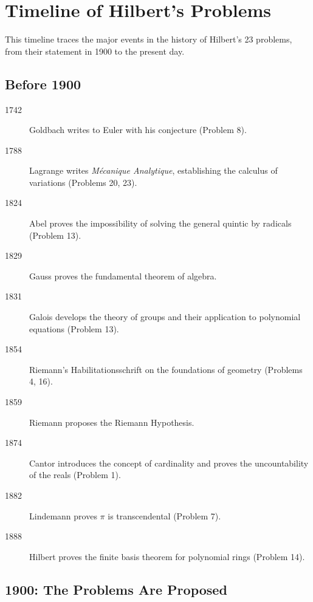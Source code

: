 
\chapter*{Timeline of Hilbert's Problems}

This timeline traces the major events in the history of Hilbert's 23 problems, from their statement in 1900 to the present day.

\section*{Before 1900}

\begin{description}
    \item[1742] Goldbach writes to Euler with his conjecture (Problem 8).
    \item[1788] Lagrange writes \textit{M\'ecanique Analytique}, establishing the calculus of variations (Problems 20, 23).
    \item[1824] Abel proves the impossibility of solving the general quintic by radicals (Problem 13).
    \item[1829] Gauss proves the fundamental theorem of algebra.
    \item[1831] Galois develops the theory of groups and their application to polynomial equations (Problem 13).
    \item[1854] Riemann's Habilitationsschrift on the foundations of geometry (Problems 4, 16).
    \item[1859] Riemann proposes the Riemann Hypothesis.
    \item[1874] Cantor introduces the concept of cardinality and proves the uncountability of the reals (Problem 1).
    \item[1882] Lindemann proves $\pi$ is transcendental (Problem 7).
    \item[1888] Hilbert proves the finite basis theorem for polynomial rings (Problem 14).
\end{description}

\section*{1900: The Problems Are Proposed}

